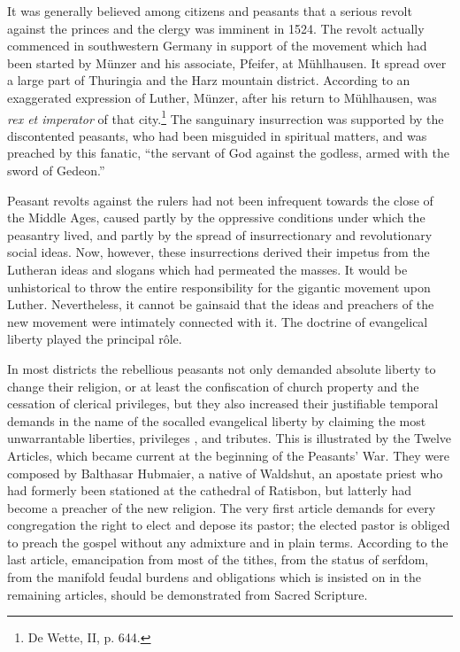 It was generally believed among citizens and peasants that a serious
revolt against the princes and the clergy was imminent in 1524.
The revolt actually commenced in southwestern Germany in support of the
movement which had been started by Münzer and his
associate, Pfeifer, at Mühlhausen. It spread over a large part of
Thuringia and the Harz mountain district. According to an exaggerated
expression of Luther, Münzer, after his return to Mühlhausen,
was \textit{rex et imperator} of that city.\footnote{De Wette, II, p. 644.}
The sanguinary insurrection
was supported by the discontented peasants, who had been misguided
in spiritual matters, and was preached by this fanatic, “the servant of
God against the godless, armed with the sword of Gedeon.”

Peasant revolts against the rulers had not been infrequent towards
the close of the Middle Ages, caused partly by the oppressive conditions
under which the peasantry lived, and partly by the spread
of insurrectionary and revolutionary social ideas. Now, however,
these insurrections derived their impetus from the Lutheran ideas
and slogans which had permeated the masses. It would be unhistorical
to throw the entire responsibility for the gigantic movement upon
Luther. Nevertheless, it cannot be gainsaid that the ideas and preachers
of the new movement were intimately connected with it. The
doctrine of evangelical liberty played the principal rôle.

In most districts the rebellious peasants not only demanded absolute
liberty to change their religion, or at least the confiscation of
church property and the cessation of clerical privileges, but they also
increased their justifiable temporal demands in the name of the socalled
evangelical liberty by claiming the most unwarrantable liberties, privileges
, and tributes. This is illustrated by the Twelve
Articles, which became current at the beginning of the Peasants’
War. They were composed by Balthasar Hubmaier, a native of Waldshut, an
apostate priest who had formerly been stationed at the cathedral of Ratisbon,
but latterly had become a preacher of the new
religion. The very first article demands for every congregation the
right to elect and depose its pastor; the elected pastor is obliged to
preach the gospel without any admixture and in plain terms. According
to the last article, emancipation from most of the tithes,
from the status of serfdom, from the manifold feudal burdens and
obligations which is insisted on in the remaining articles, should be
demonstrated from Sacred Scripture.

